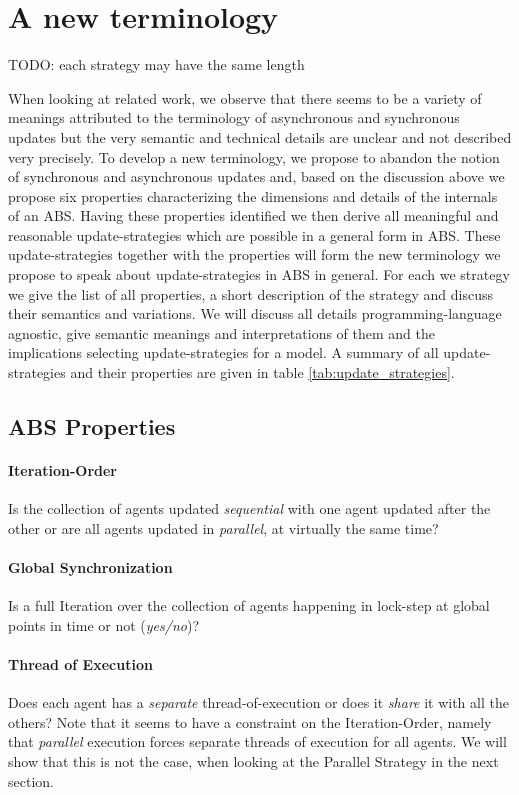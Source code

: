 \section{A new terminology}
TODO: each strategy may have the same length

When looking at related work, we observe that there seems to be a variety of meanings attributed to the terminology of asynchronous and synchronous updates but the very semantic and technical details are unclear and not described very precisely. To develop a new terminology, we propose to abandon the notion of synchronous and asynchronous updates and, based on the discussion above we propose six properties characterizing the dimensions and details of the internals of an ABS. Having these properties identified we then derive all meaningful and reasonable update-strategies which are possible in a general form in ABS. These update-strategies together with the properties will form the new terminology we propose to speak about update-strategies in ABS in general. For each we strategy we give the list of all properties, a short description of the strategy and discuss their semantics and variations. We will discuss all details programming-language agnostic, give semantic meanings and interpretations of them and the implications selecting update-strategies for a model. A summary of all update-strategies and their properties are given in table \ref{tab:update_strategies}.

\subsection{ABS Properties}

\paragraph{Iteration-Order}
Is the collection of agents updated \textit{sequential} with one agent updated after the other or are all agents updated in \textit{parallel}, at virtually the same time?

\paragraph{Global Synchronization}
Is a full Iteration over the collection of agents happening in lock-step at global points in time or not (\textit{yes/no})?

\paragraph{Thread of Execution}
Does each agent has a \textit{separate} thread-of-execution or does it \textit{share} it with all the others? Note that it seems to have a constraint on the Iteration-Order, namely that \textit{parallel} execution forces separate threads of execution for all agents. We will show that this is not the case, when looking at the Parallel Strategy in the next section.

